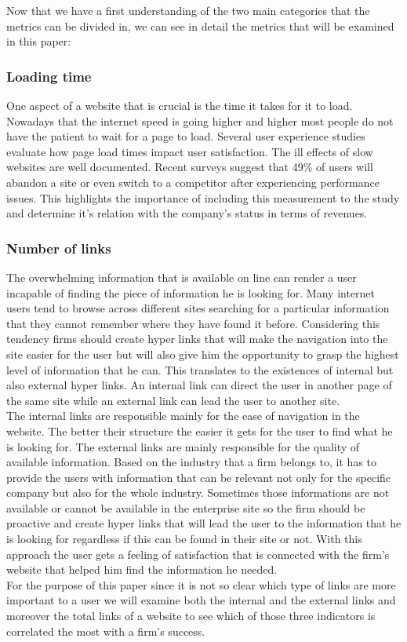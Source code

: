 \documentclass{article}
\begin{document}
Now that we have a first understanding of the two main categories that the metrics can be divided in, we can see in detail the metrics that will be examined in this paper:
\subsubsection{Loading time}\label{M:Loading time}
One aspect of a website that is crucial is the time it takes for it to load. Nowadays that the internet speed is going higher and higher most people do not have the patient to wait for a page to load. Several user experience studies evaluate how page load times impact user satisfaction. The ill effects of slow websites are well documented. Recent surveys suggest that 49\% of users will abandon a site or even switch to a competitor after experiencing performance issues. This highlights the importance of including this measurement to the study and determine it's relation with the company's status in terms of revenues.
\subsubsection{Number of links}\label{M:Number of links}
The overwhelming information that is available on line can render a user incapable of finding the piece of information he is looking for. Many internet users tend to browse across different sites searching for a particular information that they cannot remember where they have found it before. Considering this tendency firms should create hyper links that will make the navigation into the site easier for the user but will also give him the opportunity to grasp the highest level of information that he can. This translates to the existences of internal but also external hyper links. An internal link can direct the user in another page of the same site while an external link can lead the user to another site.\\
The internal links are responsible mainly for the ease of navigation in the website. The better their structure the easier it gets for the user to find what he is looking for. The external links are mainly responsible for the quality of available information. Based on the industry that a firm belongs to, it has to provide the users with information that can be relevant not only for the specific company but also for the whole industry. Sometimes those informations are not available or cannot be available in the enterprise site so the firm should be proactive and create hyper links that will lead the user to the information that he is looking for regardless if this can be found in their site or not. With this approach the user gets a feeling of satisfaction that is connected with the firm's website that helped him find the information he needed.\\
For the purpose of this paper since it is not so clear which type of links are more important to a user we will examine both the internal and the external links and moreover the total links of a website to see which of those three indicators is correlated the most with a firm's success.
\end{document}
